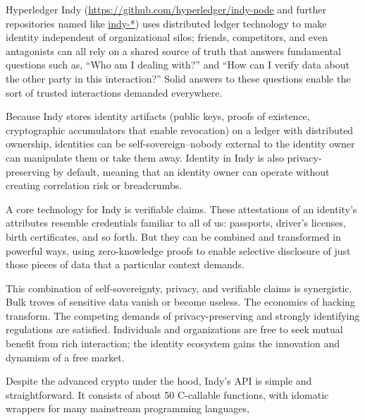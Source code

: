 Hyperledger Indy (\url{https://github.com/hyperledger/indy-node} and further repositories named like \url{indy-*}) uses distributed ledger technology to make identity independent of organizational silos; friends, competitors, and even antagonists can all rely on a shared source of truth that answers fundamental questions such as, “Who am I dealing with?” and “How can I verify data about the other party in this interaction?” Solid answers to these questions enable the sort of trusted interactions demanded everywhere.

Because Indy stores identity artifacts (public keys, proofs of existence, cryptographic accumulators that enable revocation) on a ledger with distributed ownership, identities can be self-sovereign--nobody external to the identity owner can manipulate them or take them away. Identity in Indy is also privacy-preserving by default, meaning that an identity owner can operate without creating correlation risk or breadcrumbs.

A core technology for Indy is verifiable claims. These attestations of an identity’s attributes resemble credentials familiar to all of us: passports, driver’s licenses, birth certificates, and so forth. But they can be combined and transformed in powerful ways, using zero-knowledge proofs to enable selective disclosure of just those pieces of data that a particular context demands.

This combination of self-sovereignty, privacy, and verifiable claims is synergistic. Bulk troves of sensitive data vanish or become useless. The economics of hacking transform. The competing demands of privacy-preserving and strongly identifying regulations are satisfied. Individuals and organizations are free to seek mutual benefit from rich interaction; the identity ecosystem gains the innovation and dynamism of a free market. 

Despite the advanced crypto under the hood, Indy’s API is simple and straightforward. It consists of about 50 C-callable functions, with idomatic wrappers for many mainstream programming languages, 

